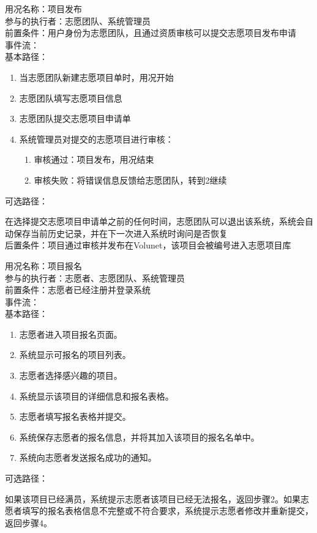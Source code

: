 \begin{framed}
\noindent
用况名称：项目发布\\
参与的执行者：志愿团队、系统管理员\\
前置条件：用户身份为志愿团队，且通过资质审核可以提交志愿项目发布申请\\
事件流：\\
基本路径：
\begin{enumerate}[itemsep=2pt,topsep=0pt,parsep=0pt,itemindent=1em]
    \item 当志愿团队新建志愿项目单时，用况开始
    \item 志愿团队填写志愿项目信息
    \item 志愿团队提交志愿项目申请单
    \item 系统管理员对提交的志愿项目进行审核：
    \begin{enumerate}[itemsep=2pt,topsep=0pt,parsep=0pt,itemindent=1em]
          \item 审核通过：项目发布，用况结束
          \item 审核失败：将错误信息反馈给志愿团队，转到2继续
      \end{enumerate}
\end{enumerate}
\noindent
可选路径：\par
    在选择提交志愿项目申请单之前的任何时间，志愿团队可以退出该系统，系统会自动保存当前历史记录，并在下一次进入系统时询问是否恢复\\
后置条件：项目通过审核并发布在Volunet，该项目会被编号进入志愿项目库

\end{framed}

\begin{framed} \noindent 用况名称：项目报名\\ 
参与的执行者：志愿者、志愿团队、系统管理员\\
前置条件：志愿者已经注册并登录系统\\ 
事件流：\\
基本路径： \begin{enumerate}[itemsep=2pt,topsep=0pt,parsep=0pt,itemindent=1em] \item 志愿者进入项目报名页面。 \item 系统显示可报名的项目列表。 \item 志愿者选择感兴趣的项目。 \item 系统显示该项目的详细信息和报名表格。 \item 志愿者填写报名表格并提交。 \item 系统保存志愿者的报名信息，并将其加入该项目的报名名单中。 \item 系统向志愿者发送报名成功的通知。 \end{enumerate} \noindent 
可选路径： \par
如果该项目已经满员，系统提示志愿者该项目已经无法报名，返回步骤2。如果志愿者填写的报名表格信息不完整或不符合要求，系统提示志愿者修改并重新提交，返回步骤4。 \\
 \end{framed}

